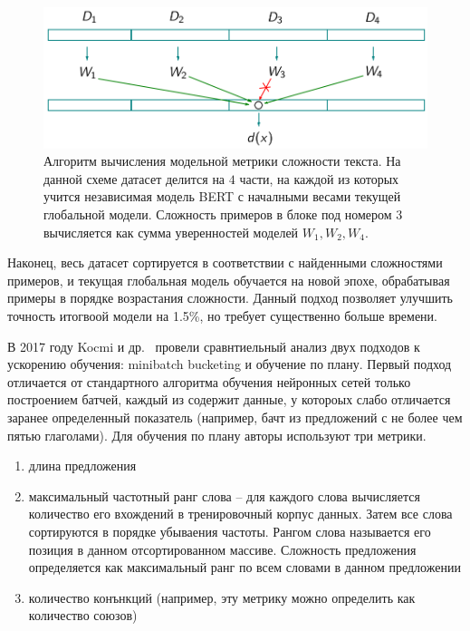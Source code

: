\documentclass{spbau-diploma}
\begin{document}
\begin{figure}[h]
	\centering
	\includegraphics[scale=0.48]{acl20_algo_difficulty}
	\caption{Алгоритм вычисления модельной метрики сложности текста. На данной схеме датасет делится на $4$ части, на каждой из которых учится независимая модель BERT с началными весами текущей глобальной модели. Сложность примеров в блоке под номером $3$ вычисляется как сумма уверенностей моделей $W_1,W_2,W_4$.}
	\label{fig:acl20_algo_difficulty}
\end{figure}

Наконец, весь датасет сортируется в соответствии с найденными сложностями примеров, и текущая глобальная модель обучается на новой эпохе, обрабатывая примеры в порядке возрастания сложности. Данный подход позволяет улучшить точность итогвоой модели на 1.5\%, но требует существенно больше времени.

В 2017 году Kocmi и др.~\cite{kocmi2017curriculum} провели сравнтиельный анализ двух подходов к ускорению обучения: minibatch bucketing и обучение по плану. Первый подход отличается от стандартного алгоритма обучения нейронных сетей только построением батчей, каждый из содержит данные, у котороых слабо отличается заранее определенный показатель (например, бачт из предложений с не более чем пятью глаголами). Для обучения по плану авторы используют три метрики.
\begin{enumerate}
	\item длина предложения
	\item максимальный частотный ранг слова -- для каждого слова вычисляется количество его вхождений в тренировочный корпус данных. Затем все слова сортируются в порядке убываения частоты. Рангом слова называется его позиция в данном отсортированном массиве. Сложность предложения определяется как максимальный ранг по всем словами в данном предложении
	\item количество конънкций (например, эту метрику можно определить как количество союзов)
\end{enumerate}
\end{document}
